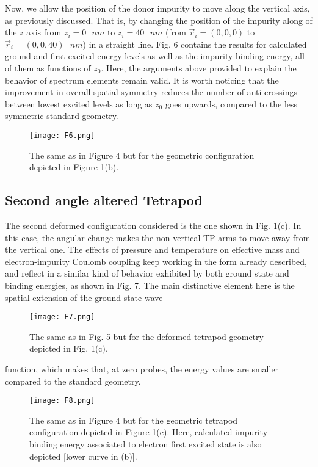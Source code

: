 \documentclass[nanomaterials,article,submit,moreauthors,pdftex]{Definitions/mdpi}
\begin{document}
Now, we allow the position of the donor impurity to move along the vertical axis, as previously discussed. That is, by changing the position of the impurity along of the $z$ axis from $z_{i}=0\text{ }nm$ to $z_{i}=40\text{ }nm$ (from $\vec{r}_{i}=(0,0,0)$ to $\vec{r}_{i}=(0,0,40)\text{ }nm$) in a straight line. Fig. 6 contains the results for calculated ground and first excited energy levels as well as the impurity binding energy, all of them as functions of $z_0$. Here, the arguments above provided to explain the behavior of spectrum elements remain valid. It is worth noticing that the improvement in overall spatial symmetry reduces the number of anti-crossings between lowest excited levels as long as $z_0$ goes upwards, compared to the less symmetric standard geometry.

\begin{figure}[H]
    \centering
    \texttt{[image: F6.png]}
    \caption{The same as in Figure 4 but for the geometric configuration depicted in Figure 1(b).}
	\label{F6}
\end{figure}

\subsection{Second angle altered Tetrapod}

The second deformed configuration considered is the one shown in Fig. 1(c). In this case, the angular change makes the non-vertical TP arms to move away from the vertical one. The effects of pressure and temperature on effective mass and electron-impurity Coulomb coupling keep working in the form already described, and reflect in a similar kind of behavior exhibited by both ground state and binding energies, as shown in Fig. 7. The main distinctive element here is the spatial extension of the ground state wave 

\begin{figure}[H]
    \centering    \texttt{[image: F7.png]}
    \caption{The same as in Fig. 5 but for the deformed tetrapod geometry depicted in Fig. 1(c).}
    \label{F7}
\end{figure}

\noindent function, which makes that, at zero probes, the energy values are smaller compared to the standard geometry.

\begin{figure}[H]
    \centering
    \texttt{[image: F8.png]}
    \caption{The same as in Figure 4 but for the geometric tetrapod configuration depicted in Figure 1(c). Here, calculated impurity binding energy associated to electron first excited state is also depicted [lower curve in (b)].}
    \label{F8}
\end{figure}
\end{document}
